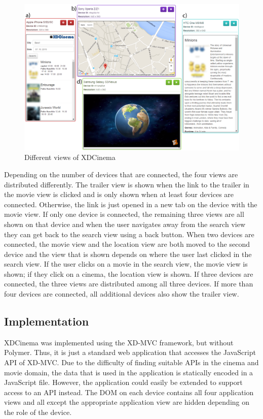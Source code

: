 \begin{figure}[H]
  \centering
    \includegraphics[width=1.0\textwidth]{images/screenshots/xdcinema_5_labeled.png}
	\caption[Screenshot XDCinema: Different views]{Different views of XDCinema}
	\label{fig:xdcinema}
\end{figure}

Depending on the number of devices that are connected, the four views are distributed differently. The trailer view is shown when the link to the trailer in the movie view is clicked and is only shown when at least four devices are connected. Otherwise, the link is just opened in a new tab on the device with the movie view. If only one device is connected, the remaining three views are all shown on that device and when the user navigates away from the search view they can get back to the search view using a back button. When two devices are connected, the movie view and the location view are both moved to the second device and the view that is shown depends on where the user last clicked in the search view. If the user clicks on a movie in the search view, the movie view is shown; if they click on a cinema, the location view is shown. If three devices are connected, the three views are distributed among all three devices. If more than four devices are connected, all additional devices also show the trailer view.

\subsection{Implementation}

XDCinema was implemented using the XD-MVC framework, but without Polymer. Thus, it is just a standard web application that accesses the JavaScript API of XD-MVC. Due to the difficulty of finding suitable APIs in the cinema and movie domain, the data that is used in the application is statically encoded in a JavaScript file. However, the application could easily be extended to support access to an API instead. The DOM on each device contains all four application views and all except the appropriate application view are hidden depending on the role of the device. 

